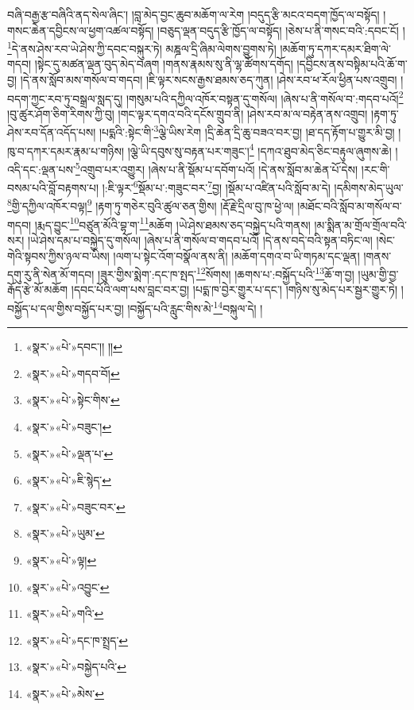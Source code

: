 བཞི་བརྒྱ་རྩ་བཞིའི་ནད་སེལ་ཞིང་། །བླ་མེད་བྱང་ཆུབ་མཆོག་ལ་རེག །བདུད་རྩི་མངའ་བདག་ཁྱོད་ལ་བསྟོད། །གསང་ཆེན་དབྱིངས་ལ་ཕྱག་འཚལ་བསྟོད། །བཅུད་ལྡན་བདུད་རྩི་ཁྱོད་ལ་བསྟོད། །ཅེས་པ་ནི་གསང་བའི་:དབང་ངོ། །\footnote{«སྣར་»«པེ་»དབང་།། །།}དེ་ནས་ཤེས་རབ་ཡེ་ཤེས་ཀྱི་དབང་བསྐུར་ཏེ། མཎྜལ་དྲི་ཞིམ་ལེགས་བྱུགས་ཏེ། །མཆོག་ཏུ་དཀར་དམར་ཐིག་ལེ་གདབ། །སྟེང་དུ་མཚན་ལྡན་བུད་མེད་བཞག །གནས་རྣམས་སུ་ནི་ལྷ་ཚོགས་དགོད། །དབྱིངས་ནས་བསྟིམ་པའི་ཆོ་ག་བྱ། །དེ་ནས་སློབ་མས་གསོལ་བ་གདབ། །ཇི་ལྟར་སངས་རྒྱས་ཐམས་ཅད་ཀུན། །ཤེས་རབ་ཕ་རོལ་ཕྱིན་པས་འགྲུབ། །བདག་ཀྱང་རབ་ཏུ་བསྒྲལ་སླད་དུ། །གསུམ་པའི་དཀྱིལ་འཁོར་བསྟན་དུ་གསོལ། །ཞེས་པ་ནི་གསོལ་བ་:གདབ་པའོ།\footnote{«སྣར་»«པེ་»གདབ་བོ།} །བུ་ཚུར་ཤོག་ཅིག་རིགས་ཀྱི་བུ། །གང་ལྟར་དགའ་བའི་དངོས་གྲུབ་ནི། །ཤེས་རབ་མ་ལ་བརྟེན་ནས་འགྲུབ། །རྟག་ཏུ་ཤེས་རབ་དོན་འདོད་པས། །པདྨའི་:སྟེང་གི་\footnote{«སྣར་»«པེ་»སྟེང་གིས་}ལྕེ་ཡིས་རེག །དྲི་ཆེན་དྲི་ཆུ་བཟའ་བར་བྱ། །ཐ་དད་རྟོག་པ་གྱུར་མི་བྱ། །ཁུ་བ་དཀར་དམར་རྣམ་པ་གཉིས། །ལྕེ་ཡི་དབུས་སུ་བརྟན་པར་གཟུང་།\footnote{«སྣར་»«པེ་»བཟུང་།} །དཀའ་ཐུབ་མེད་ཅིང་བརྟུལ་ཞུགས་ཆེ། །འདི་དང་:ལྡན་པས་\footnote{«སྣར་»«པེ་»ལྡན་པ་}འགྲུབ་པར་འགྱུར། །ཞེས་པ་ནི་སྡོམ་པ་དབོག་པའོ། །དེ་ནས་སློབ་མ་ཆེན་པོ་དེས། །རང་གི་བསམ་པའི་བློ་བརྟགས་པ། །:ཇི་ལྟར་\footnote{«སྣར་»«པེ་»ཇི་སྙེད་}སྡོམ་པ་:གཟུང་བར་\footnote{«སྣར་»«པེ་»བཟུང་བར་}བྱ། །སྡོམ་པ་འཛིན་པའི་སློབ་མ་དེ། །དམིགས་མེད་ཡུལ་\footnote{«སྣར་»«པེ་»ཡུམ་}གྱི་དཀྱིལ་འཁོར་བལྟ།\footnote{«སྣར་»«པེ་»ལྟ།} །རྟག་ཏུ་གཅེར་བུའི་ཚུལ་ཅན་གྱིས། །རྡོ་རྗེ་དྲིལ་བུ་ཁ་ཕྱེ་ལ། །མཐོང་བའི་སློབ་མ་གསོལ་བ་གདབ། །རྨད་བྱུང་\footnote{«སྣར་»«པེ་»འབྱུང་}བཙུན་མོའི་བྷ་ག་\footnote{«སྣར་»«པེ་»གའི་}མཆོག །ཡེ་ཤེས་ཐམས་ཅད་བསྐྱེད་པའི་གནས། །མ་སྨིན་མ་གྲོལ་གྲོལ་བའི་སར། །ཡེ་ཤེས་དམ་པ་བསྐྱེད་དུ་གསོལ། །ཞེས་པ་ནི་གསོལ་བ་གདབ་པའོ། །དེ་ནས་བདེ་བའི་སྟན་བཏིང་ལ། །སེང་གེའི་སྟབས་ཀྱིས་ཉལ་བ་ཡིས། །ལག་པ་སྟེང་འོག་བསྣོལ་ནས་ནི། །མཆོག་དགའ་བ་ཡི་གཏམ་དང་ལྡན། །གནས་དགུ་རུ་ནི་སེན་མོ་གདབ། །ཟུར་གྱིས་སྨེག་:དང་ཁ་སྤད་\footnote{«སྣར་»«པེ་»དང་ཁ་སྤྲད་}སོགས། །ཆགས་པ་:བསྐྱོད་པའི་\footnote{«སྣར་»«པེ་»བསྐྱེད་པའི་}ཆོ་ག་བྱ། །ཡུམ་གྱི་བྱ་རྒོད་རྩེ་མོ་མཆོག །དབང་པོའི་ལག་པས་བླང་བར་བྱ། །པདྨ་ཁ་བྱེར་གྱུར་པ་དང་། །གཉིས་སུ་མེད་པར་སྦྱར་གྱུར་ཏེ། །བསྐྱོད་པ་དལ་གྱིས་བསྐྱོད་པར་བྱ། །བསྐྱོད་པའི་རླུང་གིས་མེ་\footnote{«སྣར་»«པེ་»མེས་}བསྐུལ་དེ། །
